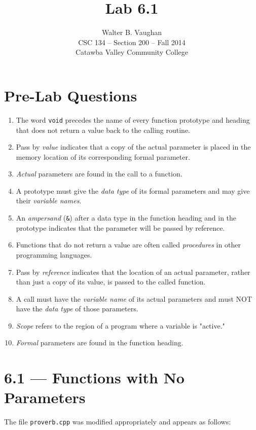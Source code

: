 \documentclass[11pt]{article}
\author{Walter B. Vaughan\\
        \small CSC 134 -- Section 200 -- Fall 2014\\
        \small Catawba Valley Community College}
\title{Lab 6.1}
\date{\vspace{-5ex}}
\begin{document}
\maketitle


\section*{Pre-Lab Questions}
\begin{enumerate}
	\item The word \texttt{void} precedes the name of every function prototype and heading that does not return a value back to the calling routine.
	\item Pass by \emph{value} indicates that a copy of the actual parameter is placed in the memory location of its corresponding formal parameter.
	\item \emph{Actual} parameters are found in the call to a function.
	\item A prototype must give the \emph{data type} of its formal parameters and may give their \emph{variable names}.
	\item An \emph{ampersand} (\texttt{\&}) after a data type in the function heading and in the prototype indicates that the parameter will be passed by reference.
	\item Functions that do not return a value are often called \emph{procedures} in other programming languages.
	\item Pass by \emph{reference} indicates that the location of an actual parameter, rather than just a copy of its value, is passed to the called function.
	\item A call must have the \emph{variable name} of its actual parameters and must NOT have the \emph{data type} of those parameters.
	\item \emph{Scope} refers to the region of a program where a variable is
"active."
	\item \emph{Formal} parameters are found in the function heading.
\end{enumerate}


\newpage %
\section*{6.1 --- Functions with No Parameters}

	The file \texttt{proverb.cpp} was modified appropriately and appears as follows:
	
\end{document}
